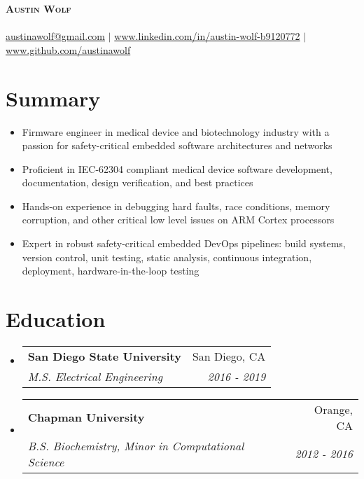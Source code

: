 \documentclass[letterpaper,11pt]{article}
\makeatletter
\newcommand{\summaryItem}[1]{
  \item\small{
    {#1 \vspace{-2pt}}
  }
}
\newcommand{\resumeSubheading}[4]{
  \vspace{-2pt}\item
    \begin{tabular*}{0.97\textwidth}[t]{l@{\extracolsep{\fill}}r}
      \textbf{#1} & #2 \\
      \textit{\small#3} & \textit{\small #4} \\
    \end{tabular*}\vspace{-7pt}
}
\newcommand{\resumeSubHeadingListStart}{\begin{itemize}[leftmargin=0.15in, label={}]}
\newcommand{\resumeSubHeadingListEnd}{\end{itemize}}
\makeatother
\begin{document}
\begin{center}
    \textbf{\Huge \scshape Austin Wolf} \\ \vspace{1pt}
    \small \textit{} \\
    \href{mailto:austinawolf@gmail.com}{austinawolf@gmail.com} $|$ 
    \href{https://www.linkedin.com/in/austin-wolf-b9120772/}{www.linkedin.com/in/austin-wolf-b9120772} $|$
    \href{https://github.com/austinawolf}{www.github.com/austinawolf}
\end{center}

\section*{Summary}
\begin{itemize}
    \summaryItem{Firmware engineer in medical device and biotechnology industry with a passion for safety-critical embedded software architectures and networks}
    \summaryItem{Proficient in IEC-62304 compliant medical device software development, documentation, design verification, and best practices}
    \summaryItem{Hands-on experience in debugging hard faults, race conditions, memory corruption, and other critical low level issues on ARM Cortex processors }
    \summaryItem{Expert in robust safety-critical embedded DevOps pipelines: build systems, version control, unit testing, static analysis, continuous integration, deployment, hardware-in-the-loop testing}
  \end{itemize}

\section{Education}
  \resumeSubHeadingListStart
    \resumeSubheading
      {San Diego State University}{San Diego, CA}
      {M.S. Electrical Engineering}{2016 - 2019}
    \resumeSubheading
      {Chapman University}{Orange, CA}
      {B.S. Biochemistry, Minor in Computational Science}{2012 - 2016}
  \resumeSubHeadingListEnd

\end{document}
